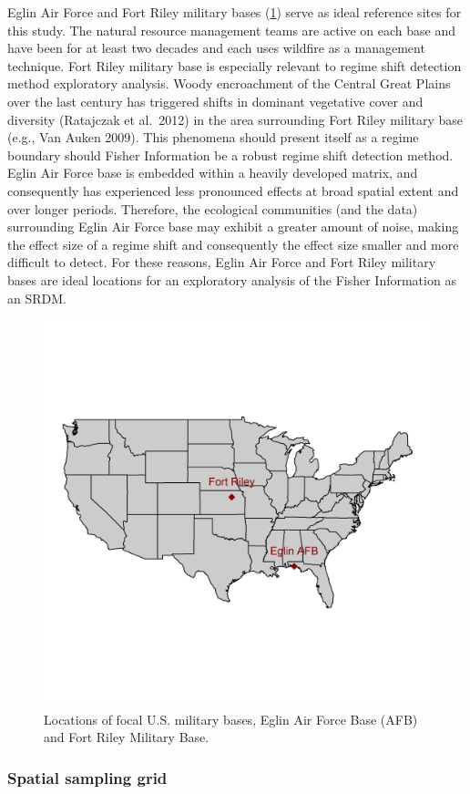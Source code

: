 \documentclass[12pt,twoside,openany]{reedthesis}
\begin{document}
Eglin Air Force and Fort Riley military bases (\ref{fig:basesOfInterestMap}) serve as ideal reference sites for this study. The natural resource management teams are active on each base and have been for at least two decades and each uses wildfire as a management technique. Fort Riley military base is especially relevant to regime shift detection method exploratory analysis. Woody encroachment of the Central Great Plains over the last century has triggered shifts in dominant vegetative cover and diversity (Ratajczak et al.~2012) in the area surrounding Fort Riley military base (e.g., Van Auken 2009). This phenomena should present itself as a regime boundary should Fisher Information be a robust regime shift detection method. Eglin Air Force base is embedded within a heavily developed matrix, and consequently has experienced less pronounced effects at broad spatial extent and over longer periods. Therefore, the ecological communities (and the data) surrounding Eglin Air Force base may exhibit a greater amount of noise, making the effect size of a regime shift and consequently the effect size smaller and more difficult to detect. For these reasons, Eglin Air Force and Fort Riley military bases are ideal locations for an exploratory analysis of the Fisher Information as an SRDM.
\begin{figure}

{\centering \includegraphics[width=0.85\linewidth]{./chapterFiles/fisherSpatial/figures/figsCalledInDiss/basesOfInterestMap} 

}

\caption{Locations of focal U.S. military bases, Eglin Air Force Base (AFB) and Fort Riley Military Base.}\label{fig:basesOfInterestMap}
\end{figure}
\hypertarget{spatial-sampling-grid}{%
\subsubsection{Spatial sampling grid}\label{spatial-sampling-grid}}
\end{document}
